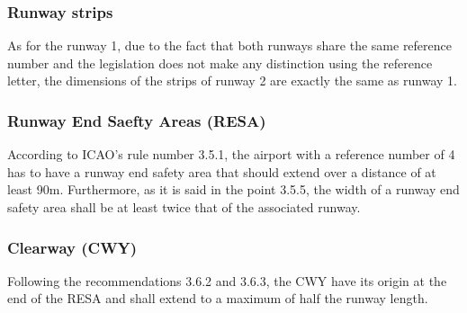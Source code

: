 	
	\subsubsection{Runway strips}
	As for the runway 1, due to the fact that both runways share the same reference number and the legislation does not make any distinction using the reference letter, the dimensions of the strips of runway 2 are exactly the same as runway 1. 
	
	\subsubsection{Runway End Saefty Areas (RESA)}
	According to ICAO's rule number 3.5.1, the airport with a reference number of 4 has to have a runway end safety area that should extend over a distance of at least 90m. Furthermore, as it is said in the point 3.5.5, the width of a runway end safety area shall be at least twice that of the associated runway. 
	
	\subsubsection{Clearway (CWY)}
	Following the recommendations 3.6.2 and 3.6.3, the CWY have its origin at the end of the RESA and shall extend to a maximum of half the runway length.  
	
	
		
		
		